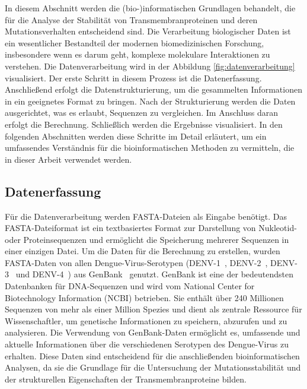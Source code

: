 \documentclass[german,version-2022-01]{uzl-thesis}
\begin{document}
In diesem Abschnitt werden die (bio-)informatischen Grundlagen behandelt, die f\"ur die Analyse der Stabilit\"at von Transmembranproteinen und deren Mutationsverhalten entscheidend sind. Die Verarbeitung biologischer Daten ist ein wesentlicher Bestandteil der modernen biomedizinischen Forschung, insbesondere wenn es darum geht, komplexe molekulare Interaktionen zu verstehen. Die Datenverarbeitung wird in der Abbildung \ref{fig:datenverarbeitung} visualisiert. Der erste Schritt in diesem Prozess ist die Datenerfassung. Anschlie\ss{}end erfolgt die Datenstrukturierung, um die gesammelten Informationen in ein geeignetes Format zu bringen. Nach der Strukturierung werden die Daten ausgerichtet, was es erlaubt, Sequenzen zu vergleichen. Im Anschluss daran erfolgt die Berechnung. Schlie\ss{}lich werden die Ergebnisse visualisiert. In den folgenden Abschnitten werden diese Schritte im Detail erl\"autert, um ein umfassendes Verst\"andnis f\"ur die bioinformatischen Methoden zu vermitteln, die in dieser Arbeit verwendet werden.

\subsection{Datenerfassung}
F\"ur die Datenverarbeitung werden FASTA-Dateien als Eingabe ben\"otigt. Das FASTA-Dateiformat ist ein textbasiertes Format zur Darstellung von Nukleotid- oder Proteinsequenzen und erm\"oglicht die Speicherung mehrerer Sequenzen in einer einzigen Datei. Um die Daten f\"ur die Berechnung zu erstellen, wurden FASTA-Daten von allen Dengue-Virus-Serotypen (DENV-1~\cite{tittarelli_dengue_2014}, DENV-2~\cite{cao_retrospective_2023}, DENV-3~\cite{peyrefitte_genetic_2003} und DENV-4~\cite{wardhani_genetic_2023}) aus GenBank~\cite{genbank} genutzt. GenBank ist eine der bedeutendsten Datenbanken f\"ur DNA-Sequenzen und wird vom National Center for Biotechnology Information (NCBI) betrieben. Sie enth\"alt \"uber 240 Millionen Sequenzen von mehr als einer Million Spezies und dient als zentrale Ressource f\"ur Wissenschaftler, um genetische Informationen zu speichern, abzurufen und zu analysieren. Die Verwendung von GenBank-Daten erm\"oglicht es, umfassende und aktuelle Informationen \"uber die verschiedenen Serotypen des Dengue-Virus zu erhalten. Diese Daten sind entscheidend f\"ur die anschlie\ss{}enden bioinformatischen Analysen, da sie die Grundlage f\"ur die Untersuchung der Mutationsstabilit\"at und der strukturellen Eigenschaften der Transmembranproteine bilden.
\end{document}
